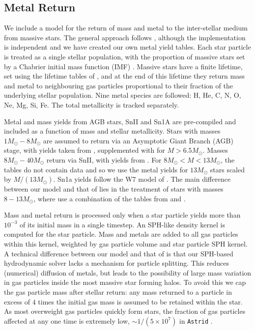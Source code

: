 \documentclass[fleqn,usenatbib]{mnras}
\def\astrid{\texttt{Astrid} }
\begin{document}
\subsection{Metal Return}
\label{sec:metals}

We include a model for the return of mass and metal to the inter-stellar medium from massive stars. The general approach follows \cite{Vogelsberger:2013, Pillepich:2018}, although the implementation is independent and we have created our own metal yield tables. Each star particle is treated as a single stellar population, with the proportion of massive stars set by a Chabrier initial mass function (IMF) \citep{Chabrier:2003}. Massive stars have a finite lifetime, set using the lifetime tables of \cite{Portinari:1998}, and at the end of this lifetime they return mass and metal to neighbouring gas particles proportional to their fraction of the underlying stellar population. Nine metal species are followed: H, He, C, N, O, Ne, Mg, Si, Fe. The total metallicity is tracked separately.

Metal and mass yields from AGB stars, SnII and Sn1A are pre-compiled and included as a function of mass and stellar metallicity. Stars with masses $1 M_\odot - 8 M_\odot$ are assumed to return via an Asymptotic Giant Branch (AGB) stage, with yields taken from \cite{Karakas:2010}, supplemented with \cite{Doherty:2014a, Doherty:2014b} for $M > 6.5 M_\odot$. Masses $8 M_\odot - 40 M_\odot$  return via SnII, with yields from \cite{Kobayashi:2006}. For $8 M_\odot < M < 13 M_\odot$, the tables do not contain data and so we use the metal yields for $13 M_\odot$ stars scaled by $M / (13 M_\odot)$. Sn1a yields follow the W7 model of \cite{Nomoto:1997}. The main difference between our model and that of \cite{Pillepich:2018} lies in the treatment of stars with masses $8 - 13 M_\odot$, where \cite{Pillepich:2018} use a combination of the tables from \cite{Portinari:1998} and \cite{Karakas:2010}.

Mass and metal return is processed only when a star particle yields more than $10^{-3}$ of its initial mass in a single timestep. An SPH-like density kernel is computed for the star particle. Mass and metals are added to all gas particles within this kernel, weighted by gas particle volume and star particle SPH kernel. A technical difference between our model and that of \cite{Pillepich:2018} is that our SPH-based hydrodynamic solver lacks a mechanism for particle splitting. This reduces (numerical) diffusion of metals, but leads to the possibility of large mass variation in gas particles inside the most massive star forming halos. To avoid this we cap the gas particle mass after stellar return: any mass returned to a particle in excess of $4$ times the initial gas mass is assumed to be retained within the star. As most overweight gas particles quickly form stars, the fraction of gas particles affected at any one time is extremely low, $\sim 1/(5\times 10^7)$ in \astrid.
\end{document}
